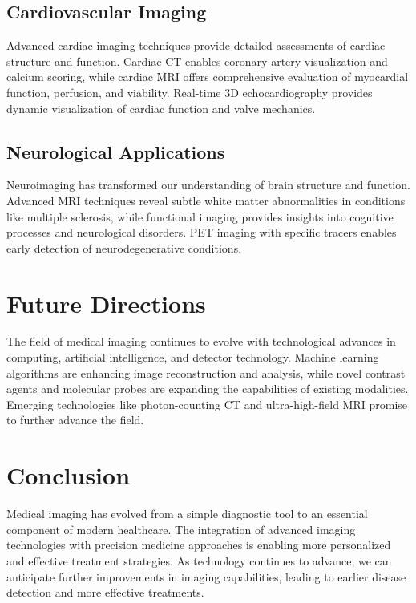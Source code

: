 \documentclass[12pt]{article}
\begin{document}
\subsection{Cardiovascular Imaging}
Advanced cardiac imaging techniques provide detailed assessments of cardiac structure and function. Cardiac CT enables coronary artery visualization and calcium scoring, while cardiac MRI offers comprehensive evaluation of myocardial function, perfusion, and viability. Real-time 3D echocardiography provides dynamic visualization of cardiac function and valve mechanics.

\subsection{Neurological Applications}
Neuroimaging has transformed our understanding of brain structure and function. Advanced MRI techniques reveal subtle white matter abnormalities in conditions like multiple sclerosis, while functional imaging provides insights into cognitive processes and neurological disorders. PET imaging with specific tracers enables early detection of neurodegenerative conditions.

\section{Future Directions}
The field of medical imaging continues to evolve with technological advances in computing, artificial intelligence, and detector technology. Machine learning algorithms are enhancing image reconstruction and analysis, while novel contrast agents and molecular probes are expanding the capabilities of existing modalities. Emerging technologies like photon-counting CT and ultra-high-field MRI promise to further advance the field.

\section{Conclusion}
Medical imaging has evolved from a simple diagnostic tool to an essential component of modern healthcare. The integration of advanced imaging technologies with precision medicine approaches is enabling more personalized and effective treatment strategies. As technology continues to advance, we can anticipate further improvements in imaging capabilities, leading to earlier disease detection and more effective treatments.
\end{document}
